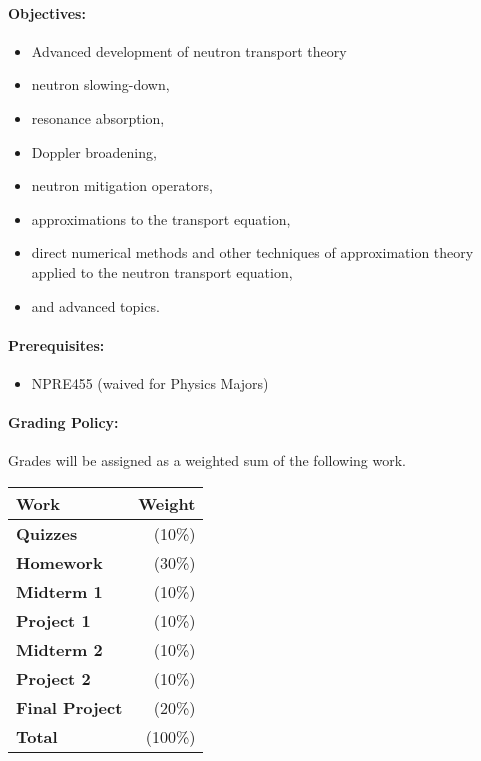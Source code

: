 \documentclass[11pt, a4paper]{article}
\begin{document}
\paragraph{Objectives:}
\begin{itemize}
\item Advanced development of neutron transport theory
\item  neutron slowing-down,
\item resonance absorption,
\item Doppler broadening,
\item neutron mitigation operators,
\item  approximations to the transport equation,
\item  direct numerical methods and other techniques of approximation theory 
        applied to the neutron transport equation,
\item  and advanced topics. 
\end{itemize}

\paragraph{Prerequisites:}
\begin{itemize}
\item NPRE455 (waived for Physics Majors) 
\end{itemize}

\paragraph{Grading Policy:} Grades will be assigned as a weighted sum of the
following work.

\begin{table}[h]
\begin{tabularx}{\textwidth}{Xr}
        \textbf{Work} & \textbf{Weight} \\
\hline
\textbf{Quizzes}     & (10\%)  \\
\textbf{Homework}    & (30\%)  \\
\textbf{Midterm 1}   & (10\%)  \\
\textbf{Project 1}    & (10\%)  \\
\textbf{Midterm 2}   & (10\%)  \\
\textbf{Project 2}    & (10\%)  \\
\textbf{Final Project}  & (20\%)  \\
\hline
\textbf{Total}       & (100\%)\\
\end{tabularx}
\end{table}
\end{document}
